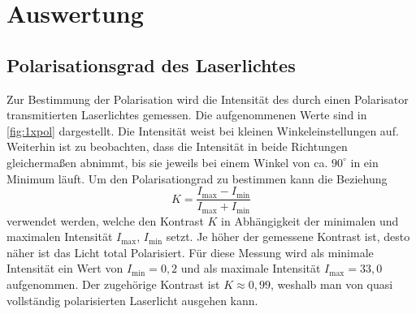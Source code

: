 \documentclass[numbers=noenddot,a4paper,notitlepage,twoside,BCOR15mm]{scrartcl}
\begin{document}
	\clearpage
	\section{Auswertung}
	
	\subsection{Polarisationsgrad des Laserlichtes}
	
	Zur Bestimmung der Polarisation wird die Intensität des durch einen Polarisator transmitierten Laserlichtes gemessen. Die aufgenommenen Werte sind in \autoref{fig:1xpol} dargestellt. Die Intensität weist bei kleinen Winkeleinstellungen auf. Weiterhin ist zu beobachten, dass die Intensität in beide Richtungen gleichermaßen abnimmt, bis sie jeweils bei einem Winkel von ca. $90^\circ$ in ein Minimum läuft. Um den Polarisationgrad zu bestimmen kann die Beziehung
	\begin{equation}
		K = \frac{I_\mathrm{max}-I_\mathrm{min}}{I_\mathrm{max}+I_\mathrm{min}}
		\label{eq:kontrast}
	\end{equation}
	verwendet werden, welche den Kontrast $K$ in Abhängigkeit der minimalen und maximalen Intensität $I_\mathrm{max}$, $I_\mathrm{min}$ setzt. Je höher der gemessene Kontrast ist, desto näher ist das Licht total Polarisiert. Für diese Messung wird als minimale Intensität ein Wert von $I_\mathrm{min} = 0,2$ und als maximale Intensität $I_\mathrm{max} = 33,0$ aufgenommen. Der zugehörige Kontrast ist $K \approx 0,99$, weshalb man von quasi vollständig polarisierten Laserlicht ausgehen kann.
	
\end{document}

